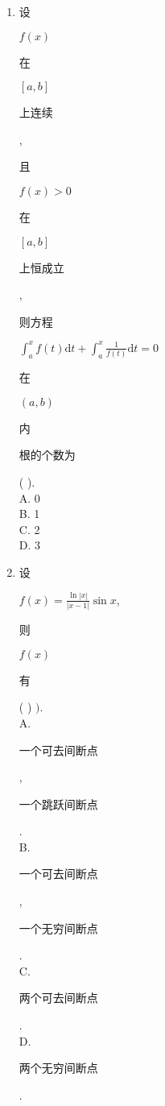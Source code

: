 \documentclass[10pt]{article}
\begin{document}
\begin{enumerate}
  \item \begin{CJK}{UTF8}{mj}设\end{CJK} $f(x)$ \begin{CJK}{UTF8}{mj}在\end{CJK} $[a, b]$ \begin{CJK}{UTF8}{mj}上连续\end{CJK}, \begin{CJK}{UTF8}{mj}且\end{CJK} $f(x)>0$ \begin{CJK}{UTF8}{mj}在\end{CJK} $[a, b]$ \begin{CJK}{UTF8}{mj}上恒成立\end{CJK}, \begin{CJK}{UTF8}{mj}则方程\end{CJK} $\int_{a}^{x} f(t) \mathrm{d} t+\int_{a}^{x} \frac{1}{f(t)} \mathrm{d} t=0$ \begin{CJK}{UTF8}{mj}在\end{CJK} $(a, b)$ \begin{CJK}{UTF8}{mj}内\end{CJK} \begin{CJK}{UTF8}{mj}根的个数为\end{CJK} ( ).\\
A. 0\\
B. 1\\
C. 2\\
D. 3

  \item \begin{CJK}{UTF8}{mj}设\end{CJK} $f(x)=\frac{\ln |x|}{|x-1|} \sin x$, \begin{CJK}{UTF8}{mj}则\end{CJK} $f(x)$ \begin{CJK}{UTF8}{mj}有\end{CJK} ( ) $)$.\\
A. \begin{CJK}{UTF8}{mj}一个可去间断点\end{CJK}, \begin{CJK}{UTF8}{mj}一个跳跃间断点\end{CJK}.\\
B. \begin{CJK}{UTF8}{mj}一个可去间断点\end{CJK},\begin{CJK}{UTF8}{mj}一个无穷间断点\end{CJK}.\\
C. \begin{CJK}{UTF8}{mj}两个可去间断点\end{CJK}.\\
D. \begin{CJK}{UTF8}{mj}两个无穷间断点\end{CJK}.


\end{enumerate}
\end{document}
